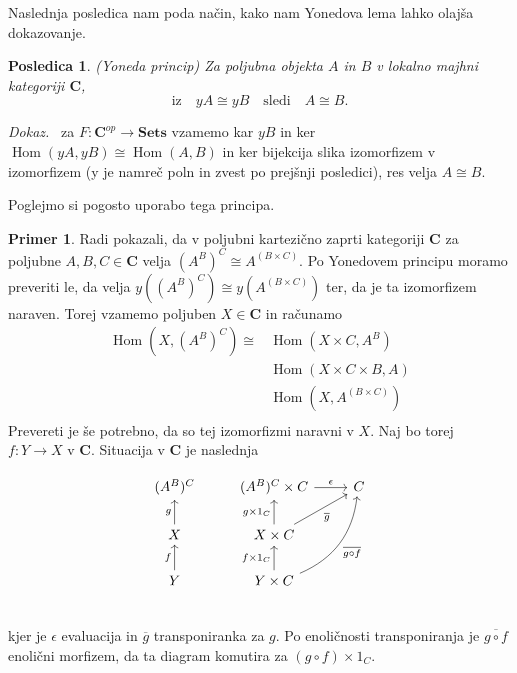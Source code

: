 \documentclass[12pt,a4paper]{book}
\theoremstyle{definition}
\theoremstyle{plain}
\newtheorem{posledica}{Posledica}[definicija]
\newenvironment{dokaz}{\emph{Dokaz.}\ }{\hspace{\fill}{$\Box$}}
\theoremstyle{definition}
\newtheorem{primer}{Primer}[section]
\theoremstyle{remark}
\newcommand{\cat}[1]{\textbf{#1}}
\DeclareMathOperator{\Hom}{Hom}
\begin{document}
Naslednja posledica nam poda način, kako nam Yonedova lema lahko olajša dokazovanje.

\begin{posledica} \emph{(Yoneda princip)}
Za poljubna objekta $A$ in $B$ v lokalno majhni kategoriji $\cat{C}$,
$$\text{iz} \quad yA \cong yB \quad\text{sledi}\quad A \cong B .$$
\end{posledica}
\begin{dokaz}
za $F : \cat{C}^{op} \to \cat{Sets}$ vzamemo kar $yB$ in ker $\Hom(yA,yB) \cong \Hom(A,B)$ in ker bijekcija slika izomorfizem v izomorfizem (y je namreč poln in zvest po prejšnji posledici), res velja $A \cong B$.
\end{dokaz}


Poglejmo si pogosto uporabo tega principa.

\begin{primer}
Radi pokazali, da v poljubni kartezično zaprti kategoriji $\cat{C}$ za poljubne $A,B,C \in \cat{C}$ velja $(A^B)^C \cong A^{(B \times C)}$.
Po Yonedovem principu moramo preveriti le, da velja $y((A^B)^C) \cong y(A^{(B \times C)})$ ter, da je ta izomorfizem naraven. Torej vzamemo poljuben $X \in \cat{C}$ in računamo
\begin{align*}
\Hom(X, (A^B)^C) \cong &\Hom(X \times C, A^B) \\
&\Hom(X \times C \times B, A) \\
&\Hom(X, A^{(B \times C)}) \\
\end{align*}
Prevereti je še potrebno, da so tej izomorfizmi naravni v $X$.
Naj bo torej $f : Y \to X$ v $ \cat{C}$. Situacija v $\cat{C}$ je naslednja

\begin{equation}
\begin{tikzcd}
(A^B)^C & (A^B)^C \times C \ar[r, "\epsilon"] & C \\
X \ar[u, "g"] & X \times C \ar[u, "g \times 1_C"] \ar[ur, "\overline{g}"'] & \\
Y \ar[u, "f"] & Y \times C \ar[u, "f \times 1_C"] \ar[uur, bend right, "\overline{g \circ f}"'] & \\
\end{tikzcd}
\end{equation}
kjer je $\epsilon$ evaluacija in $\overline{g}$ transponiranka za $g$. Po enoličnosti transponiranja je $\overline{g \circ f}$ enolični morfizem, da ta diagram komutira za $(g \circ f) \times 1_C$.


\end{primer}
\end{document}
